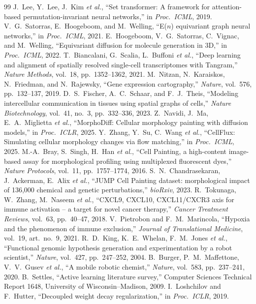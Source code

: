 \documentclass[journal]{IEEEtran}
\begin{document}
\begin{thebibliography}{99}
 J.~Lee, Y.~Lee, J.~Kim \emph{et al.}, ``Set transformer: A framework for attention-based permutation-invariant neural networks,'' in \emph{Proc.\ ICML}, 2019.
 V.~G.~Satorras, E.~Hoogeboom, and M.~Welling, ``E($n$) equivariant graph neural networks,'' in \emph{Proc.\ ICML}, 2021.
 E.~Hoogeboom, V.~G.~Satorras, C.~Vignac, and M.~Welling, ``Equivariant diffusion for molecule generation in 3D,'' in \emph{Proc.\ ICML}, 2022.
 T.~Biancalani, G.~Scalia, L.~Buffoni \emph{et al.}, ``Deep learning and alignment of spatially resolved single-cell transcriptomes with Tangram,'' \emph{Nature Methods}, vol.~18, pp.~1352--1362, 2021.
 M.~Nitzan, N.~Karaiskos, N.~Friedman, and N.~Rajewsky, ``Gene expression cartography,'' \emph{Nature}, vol.~576, pp.~132--137, 2019.
 D.~S.~Fischer, A.~C.~Schaar, and F.~J.~Theis, ``Modeling intercellular communication in tissues using spatial graphs of cells,'' \emph{Nature Biotechnology}, vol.~41, no.~3, pp.~332--336, 2023.
 Z.~Navidi, J.~Ma, E.~A.~Miglietta \emph{et al.}, ``MorphoDiff: Cellular morphology painting with diffusion models,'' in \emph{Proc.\ ICLR}, 2025.
 Y.~Zhang, Y.~Su, C.~Wang \emph{et al.}, ``CellFlux: Simulating cellular morphology changes via flow matching,'' in \emph{Proc.\ ICML}, 2025.
 M.-A.~Bray, S.~Singh, H.~Han \emph{et al.}, ``Cell Painting, a high-content image-based assay for morphological profiling using multiplexed fluorescent dyes,'' \emph{Nature Protocols}, vol.~11, pp.~1757--1774, 2016.
 S.~N.~Chandrasekaran, J.~Ackerman, E.~Alix \emph{et al.}, ``JUMP Cell Painting dataset: morphological impact of 136,000 chemical and genetic perturbations,'' \emph{bioRxiv}, 2023.
 R.~Tokunaga, W.~Zhang, M.~Naseem \emph{et al.}, ``CXCL9, CXCL10, CXCL11/CXCR3 axis for immune activation -- a target for novel cancer therapy,'' \emph{Cancer Treatment Reviews}, vol.~63, pp.~40--47, 2018.
 V.~Pietrobon and F.~M.~Marincola, ``Hypoxia and the phenomenon of immune exclusion,'' \emph{Journal of Translational Medicine}, vol.~19, art.~no.~9, 2021.
 R.~D.~King, K.~E.~Whelan, F.~M.~Jones \emph{et al.}, ``Functional genomic hypothesis generation and experimentation by a robot scientist,'' \emph{Nature}, vol.~427, pp.~247--252, 2004.
 B.~Burger, P.~M.~Maffettone, V.~V.~Gusev \emph{et al.}, ``A mobile robotic chemist,'' \emph{Nature}, vol.~583, pp.~237--241, 2020.
 B.~Settles, ``Active learning literature survey,'' Computer Sciences Technical Report 1648, University of Wisconsin--Madison, 2009.
 I.~Loshchilov and F.~Hutter, ``Decoupled weight decay regularization,'' in \emph{Proc.\ ICLR}, 2019.
\end{thebibliography}
\end{document}
